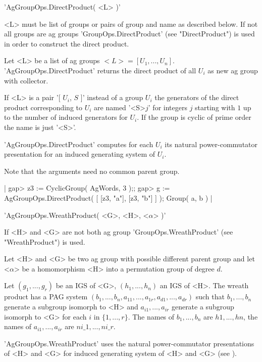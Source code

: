 
'AgGroupOps.DirectProduct( <L> )'

<L> must be list of groups or pairs of group and name as described below.
If   not  all   groups  are  ag   groups   'GroupOps.DirectProduct'  (see
"DirectProduct") is used in order to construct the direct product.

Let   <L> be a    list  of   ag  groups  $<L>    = [ U_1,  ...,  U_n  ]$.
'AgGroupOps.DirectProduct' returns the direct product of all $U_i$ as new
ag group with collector.

If <L> is a pair '[ $U_i$, $S$ ]' instead of a group $U_i$ the generators
of  the direct product  corresponding to   $U_i$ are  named  '<S>$j$' for
integers $j$ starting with $1$ up to the number of induced generators for
$U_i$.  If the group is cyclic of prime order the name is just '<S>'.

'AgGroupOps.DirectProduct'  computes   for     each $U_i$   its   natural
power-commutator presentation for an induced generating system of $U_i$.

Note that the arguments need no common parent group.

|    gap> z3 := CyclicGroup( AgWords, 3 );;
    gap> g := AgGroupOps.DirectProduct( [ [z3, "a"], [z3, "b"] ] );
    Group( a, b ) |


'AgGroupOps.WreathProduct( <G>, <H>, <$\alpha$> )'

If  <H> and  <G>  are  not  both  ag  group 'GroupOps.WreathProduct' (see
"WreathProduct") is used.

Let <H> and <G> be two ag group with  possible different parent group and
let <$\alpha$> be  a homomorphism <H> into a  permutation group of degree
$d$.

Let $(g_1, ..., g_r)$ be an IGS of <G>, $(h_1, ..., h_n)$  an IGS of <H>.
The wreath product has a PAG system $(b_1, ..., b_n, a_{11}, ..., a_{1r},
a_{d1}, ...,  a_{dr})$ such that  $b_1, ...,   b_n$  generate a  subgroup
isomorph to <H> and $a_{i1}, ..., a_{ir}$ generate a subgroup isomorph to
<G> for each $i$ in  $\{1, ..., r\}$.   The  names of $b_1, ..., b_n$ are
$h1, ...,   hn$, the names of $a_{i1},   ...,  a_{ir}$ are   $ni\_1, ...,
ni\_r$.

'AgGroupOps.WreathProduct'     uses     the    natural   power-commutator
presentations of <H> and <G> for induced generating system of <H> and <G>
(see \cite{Thi87}).

